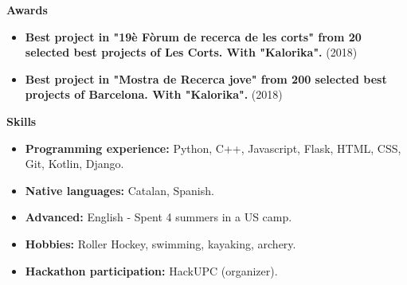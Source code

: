 \documentclass[letterpaper,12pt]{article}
\newcommand{\resitem}[1]{\item #1 \vspace{-2pt}}
\newcommand{\resheading}[1]{{\large \colorbox{mygrey}{\begin{minipage}{\textwidth}{\textbf{#1 \vphantom{p\^{E}}}}\end{minipage}}}}
\begin{document}
\resheading{Awards}
	\begin{itemize}
		\resitem{\textbf{Best project in "19\`e F\`orum de recerca de les corts" from 20 selected best projects of Les Corts. With "Kalorika".} (2018)}
		\resitem{\textbf{Best project in "Mostra de Recerca jove" from 200 selected best projects of Barcelona. With "Kalorika".} (2018)}
	\end{itemize}



\resheading{Skills}
	\begin{itemize}
		\resitem{\textbf{Programming experience:} Python, C++, Javascript, Flask, HTML, CSS, Git, Kotlin, Django.}
		\resitem{\textbf{Native languages:} Catalan, Spanish.}
		\resitem{ \textbf{Advanced:} English - Spent 4 summers in a US camp.}
		\resitem{\textbf{Hobbies:} Roller Hockey, swimming, kayaking, archery.}
		\resitem{\textbf{Hackathon participation:} HackUPC (organizer).}
	\end{itemize}
\end{document}
